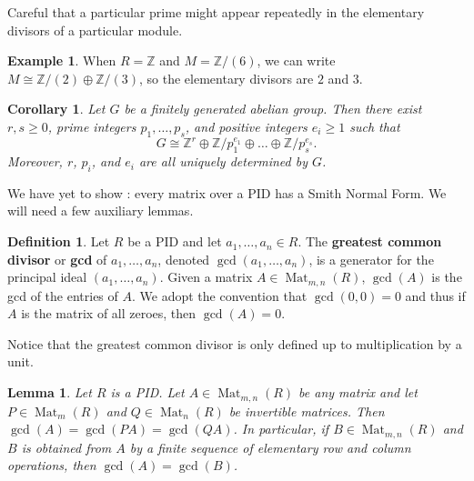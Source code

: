 \documentclass[12pt]{report}
\newtheorem{lemma}[theorem]{Lemma}
\newtheorem{corollary}[theorem]{Corollary}
\numberwithin{equation}{section}
\numberwithin{theorem}{chapter}
\theoremstyle{definition}
\newtheorem{definition}[theorem]{Definition}
\newtheorem{example}[theorem]{Example}
\newtheorem*{basic properties}{Basic Properties}
\newtheorem*{Important Remark}{Important Remark}
\newcommand{\df}[1]{{\bf #1}\index{#1}}
\DeclareMathOperator{\M}{Mat}
\begin{document}
Careful that a particular prime might appear repeatedly in the elementary divisors of a particular module.

\begin{example}
When $R = \mathbb{Z}$ and $M = \mathbb{Z}/(6)$, we can write $M\cong \mathbb{Z}/(2)\oplus \mathbb{Z}/(3)$, so the elementary divisors are $2$ and $3$.
\end{example}


\begin{corollary}
Let $G$ be a finitely generated abelian group. Then there exist $r,s \geqslant 0$, prime integers $p_1, \ldots, p_s $, and positive integers $e_i \geqslant 1$ such that 
$$G \cong \mathbb{Z}^r\oplus \mathbb{Z}/p_1^{e_1} \oplus \dots \oplus \mathbb{Z}/p_s^{e_s}.$$
Moreover, $r$, $p_i$, and $e_i$ are all uniquely determined by $G$.
\end{corollary}




We have yet to show : every matrix over a PID has a Smith Normal Form. We will need a few auxiliary lemmas.




\begin{definition}
Let $R$ be a PID and let $a_1, \ldots, a_n \in R$. The \df{greatest common divisor} or \df{gcd} of $a_1, \ldots, a_n$, denoted $\gcd(a_1, \ldots, a_n)$, is a generator for the principal ideal $(a_1, \ldots, a_n)$. Given a matrix $A \in \M_{m,n}(R)$, $\gcd(A)$ is the gcd of the entries of $A$. We adopt the convention that $\gcd(0,0)=0$ and thus if $A$ is the matrix of all zeroes, then $\gcd(A) = 0$.
\end{definition}
 
Notice that the greatest common divisor is only defined up to multiplication by a unit. 

\begin{lemma}\label{lemma gcd stays the same} 
Let $R$ is a PID. Let $A \in \M_{m,n}(R)$ be any matrix and let $P \in \M_m(R)$ and $Q \in \M_n(R)$ be invertible matrices. Then $\gcd(A) = \gcd(PA) = \gcd(QA)$.
In particular, if $B \in \M_{m,n}(R)$ and $B$ is obtained from $A$ by a finite sequence of elementary row and column operations, then $\gcd(A) = \gcd(B)$. 
\end{lemma}
\end{document}
